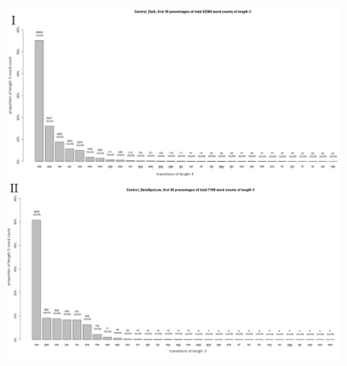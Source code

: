 \documentclass[a4paper,12pt]{article}
\begin{document}
\begin{figure}[h!]
\begin{center}
\includegraphics[width=15cm,height=17cm]{transitionsperboutlength1.png}
\end{center}
\end{figure}
\end{document}
